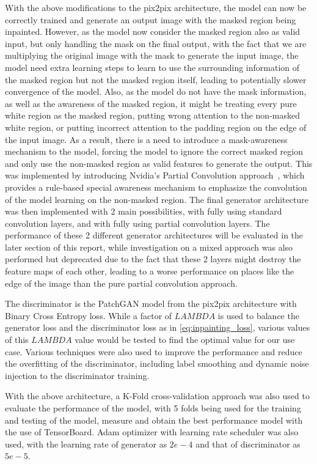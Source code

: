 \documentclass[10pt,twocolumn,letterpaper]{article}
\begin{document}
With the above modifications to the pix2pix architecture, the model can now be correctly trained and generate an output image with the masked region being inpainted. However, as the model now 
consider the masked region also as valid input, but only handling the mask on the final output, with the fact that we are multiplying the original image with the mask to generate the input image, 
the model need extra learning steps to learn to use the surrounding information of the masked region but not the masked region itself, leading to potentially slower convergence of the model. Also,
as the model do not have the mask information, as well as the awareness of the masked region, it might be treating every pure white region as the masked region, putting wrong attention to the 
non-masked white region, or putting incorrect attention to the padding region on the edge of the input image. As a result, there is a need to introduce a mask-awareness mechanism to the 
model, forcing the model to ignore the correct masked region and only use the non-masked region as valid features to generate the output. This was implemented by introducing Nvidia's 
Partial Convolution approach~\cite{Liu2018}, which provides a rule-based special awareness mechanism to emphasize the convolution of the model learning on the non-masked region. The final 
generator architecture was then implemented with 2 main possibilities, with fully using standard convolution layers, and with fully using partial convolution layers. The performance of these 2 
different generator architectures will be evaluated in the later section of this report, while investigation on a mixed approach was also performed but deprecated due to the fact that these 2 layers 
might destroy the feature maps of each other, leading to a worse performance on places like the edge of the image than the pure partial convolution approach.

The discriminator is the PatchGAN model from the pix2pix architecture with Binary Cross Entropy loss. While a factor of $LAMBDA$ is used to balance the generator loss and the discriminator loss as in 
\cref{eq:inpainting_loss}, various values of this $LAMBDA$ value would be tested to find the optimal value for our use case. Various techniques were also used to improve the performance and reduce the 
overfitting of the discriminator, including label smoothing \cite{Muller2019} and dynamic noise injection \cite{Feng2021} to the discriminator training.

With the above architecture, a K-Fold cross-validation approach was also used to evaluate the performance of the model, with 5 folds being used for the training and testing of the model, measure and 
obtain the best performance model with the use of TensorBoard. Adam optimizer with learning rate scheduler was also used, with the learning rate of generator as $2e-4$ and that of discriminator as $5e-5$.
\end{document}
